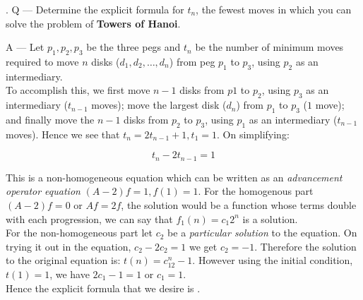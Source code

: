 \documentclass{article}
\newcounter{question}
\begin{document}
\newcommand\Que[1]{%
   \leavevmode\par
   \stepcounter{question}
   \noindent
   \thequestion. Q --- #1\par}

\newcommand\Ans[2][]{%
    \leavevmode\par\noindent
   {\leftskip37pt
    A --- \textbf{#1}#2\par}}

\Que{
    Determine the explicit formula
    for $t_n$, the fewest moves in which
    you can solve the problem of
    \textbf{Towers of Hanoi}.
}
\Ans{
    Let $p_1, p_2, p_3$ be the three pegs and
    $t_n$ be the number of minimum moves 
    required to move $n$ disks ($d_1, d_2, \dots, d_n$)
    from peg $p_1$ to $p_3$,
    using $p_2$ as an intermediary. \\

    To accomplish this, we first move $n-1$ disks
    from $p1$ to $p_2$, using $p_3$ 
    as an intermediary ($t_{n-1}$ moves);
    move the largest disk ($d_n$) from
    $p_1$ to $p_3$ ($1$ move); and finally
    move the $n-1$ disks from $p_2$ to $p_3$,
    using $p_1$ as an intermediary ($t_{n-1}$ moves).
    Hence we see that $t_n = 2t_{n-1} + 1, t_1=1$.
    On simplifying:

    \begin{equation}
        t_n-2t_{n-1}=1
    \end{equation}

    This is a non-homogeneous equation
    which can be written as an 
    \textit{advancement operator equation}
    $(A-2)f = 1, f(1)=1$.
    For the homogenous part
    $(A-2)f=0$ or $Af = 2f$, the solution would be a function
    whose terms double with each progression, we can
    say that $f_1(n)=c_1{2^n}$ is a solution. \\

    For the non-homogeneous part
    let $c_2$ be a \textit{particular solution} to
    the equation. On trying it out in the equation,
    $c_2-2c_2=1$ we get $c_2=-1$.
    Therefore the solution
    to the original equation is:
    $t(n)=c_12^n-1$.
    However using the initial condition,
    $t(1)=1$, we have $2c_1-1=1$ or $c_1=1$.\\

    Hence the explicit formula that we desire is
    \boxed{t(n) = 2^n-1}.
    }
\end{document}
